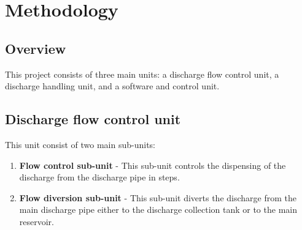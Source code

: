 \section{Methodology}
\subsection{Overview}
This project consists of three main units: a discharge flow control unit, a discharge handling  unit, and a software and control unit. 
\subsection{Discharge flow control unit}
This unit consist of two main sub-units:
\begin{enumerate}
    \item \textbf{Flow control sub-unit} -
    This sub-unit controls the dispensing of the discharge from the discharge pipe in steps.
    \item \textbf{Flow diversion sub-unit} -
    This sub-unit diverts the discharge from the main discharge pipe either to the discharge collection tank or to the main reservoir.
\end{enumerate}
\par
